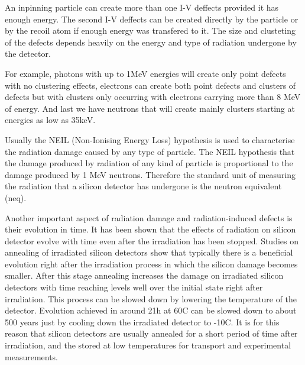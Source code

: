 An inpinning particle can create more than one I-V deffects provided it has enough energy. The second I-V deffects can be created directly by the particle or by the recoil atom if enough energy was transfered to it. The size and clusteting of the defects depends heavily on the energy and type of radiation undergone by the detector. 


For example, photons with up to 1MeV energies will create only point defects with no clustering effects, electrons can create both point defects and clusters of defects but with clusters only occurring with electrons carrying more than 8 MeV of energy. And last we have neutrons that will create mainly clusters starting at energies as low as 35keV. 

Usually the NEIL (Non-Ionising Energy Loss) hypothesis is used to characterise the radiation damage caused by any type of particle. The NEIL hypothesis that the damage produced by radiation of any kind of particle is proportional to the damage produced by 1 MeV neutrons. Therefore the standard unit of measuring the radiation that a silicon detector has undergone is the neutron equivalent (neq).

Another important aspect of radiation damage and radiation-induced defects is their evolution in time. It has been shown that the effects of radiation on silicon detector evolve with time even after the irradiation has been stopped. Studies on annealing of irradiated silicon detectors show that typically there is a beneficial evolution right after the irradiation process in which the silicon damage becomes smaller. After this stage annealing increases the damage on irradiated silicon detectors with time reaching levels well over the initial state right after irradiation. This process can be slowed down by lowering the temperature of the detector. Evolution achieved in around 21h at 60C can be slowed down to about 500 years just by cooling down the irradiated detector to -10C. It is for this reason that silicon detectors are usually annealed for a short period of time after irradiation, and the stored at low temperatures for transport and experimental measurements.

